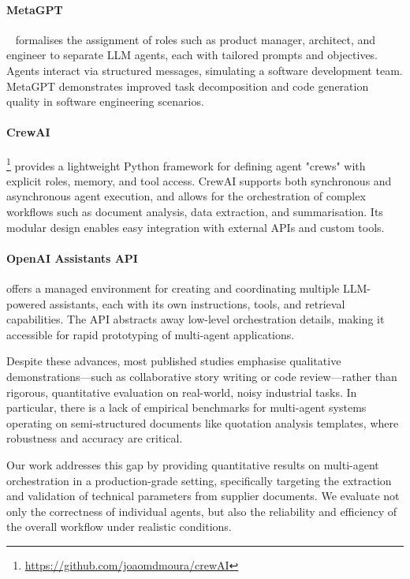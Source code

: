 \paragraph{MetaGPT}~\cite{hong2023metagpt} formalises the assignment of roles such as product manager, architect, and engineer to separate LLM agents, each with tailored prompts and objectives. Agents interact via structured messages, simulating a software development team. MetaGPT demonstrates improved task decomposition and code generation quality in software engineering scenarios.

\paragraph{CrewAI}\footnote{\url{https://github.com/joaomdmoura/crewAI}} provides a lightweight Python framework for defining agent "crews" with explicit roles, memory, and tool access. CrewAI supports both synchronous and asynchronous agent execution, and allows for the orchestration of complex workflows such as document analysis, data extraction, and summarisation. Its modular design enables easy integration with external APIs and custom tools.

\paragraph{OpenAI Assistants API} offers a managed environment for creating and coordinating multiple LLM-powered assistants, each with its own instructions, tools, and retrieval capabilities. The API abstracts away low-level orchestration details, making it accessible for rapid prototyping of multi-agent applications.

Despite these advances, most published studies emphasise qualitative demonstrations—such as collaborative story writing or code review—rather than rigorous, quantitative evaluation on real-world, noisy industrial tasks. In particular, there is a lack of empirical benchmarks for multi-agent systems operating on semi-structured documents like quotation analysis templates, where robustness and accuracy are critical.

Our work addresses this gap by providing quantitative results on multi-agent orchestration in a production-grade setting, specifically targeting the extraction and validation of technical parameters from supplier documents. We evaluate not only the correctness of individual agents, but also the reliability and efficiency of the overall workflow under realistic conditions.


